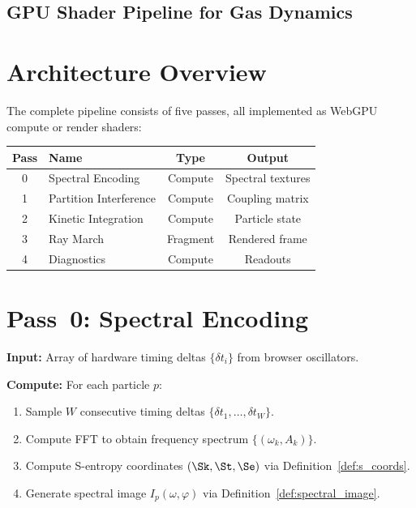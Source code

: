 
\subsection{GPU Shader Pipeline for Gas Dynamics}
\label{part:pipeline}

\section{Architecture Overview}
\label{sec:architecture}

The complete pipeline consists of five passes, all implemented as WebGPU compute or render shaders:

\begin{center}
\begin{tabular}{clcc}
\toprule
\textbf{Pass} & \textbf{Name} & \textbf{Type} & \textbf{Output} \\
\midrule
0 & Spectral Encoding      & Compute & Spectral textures \\
1 & Partition Interference  & Compute & Coupling matrix \\
2 & Kinetic Integration     & Compute & Particle state \\
3 & Ray March               & Fragment & Rendered frame \\
4 & Diagnostics             & Compute & Readouts \\
\bottomrule
\end{tabular}
\end{center}

\section{Pass~0: Spectral Encoding}
\label{sec:pass0}

\textbf{Input:} Array of hardware timing deltas $\{\delta t_i\}$ from browser oscillators.

\textbf{Compute:} For each particle $p$:
\begin{enumerate}
    \item Sample $W$ consecutive timing deltas $\{\delta t_1, \ldots, \delta t_W\}$.
    \item Compute FFT to obtain frequency spectrum $\{(\omega_k, A_k)\}$.
    \item Compute S-entropy coordinates $(\Sk, \St, \Se)$ via Definition~\ref{def:s_coords}.
    \item Generate spectral image $I_p(\omega, \varphi)$ via Definition~\ref{def:spectral_image}.
\end{enumerate}

